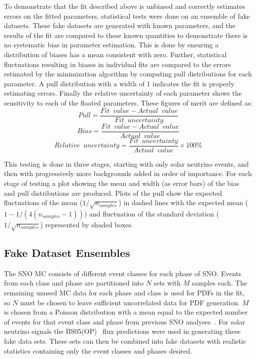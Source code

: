 To demonstrate that the fit described above is unbiased and correctly estimates errors on the fitted parameters, statistical tests were done on an ensemble of fake datasets.
These fake datasets are generated with known parameters, and the results of the fit are compared to these known quantities to demonstrate there is no systematic bias in parameter estimation.
This is done by ensuring a distribution of biases has a mean consistent with zero.
Further, statistical fluctuations resulting in biases in individual fits are compared to the errors estimated by the minimization algorithm by computing pull distributions for each parameter. 
A pull distribution with a width of 1 indicates the fit is properly estimating errors.
Finally the relative uncertainty of each parameter shows the sensitivity to each of the floated parameters.
These figures of merit are defined as:
\begin{equation}
Pull = \frac{Fit\,\,\,value - Actual\,\,\,value}{Fit\,\,\,uncertainty}
\end{equation}
\begin{equation}
Bias = \frac{Fit\,\,\,value - Actual\,\,\,value}{Actual\,\,\,value}
\end{equation}
\begin{equation}
Relative\,\,\,uncertainty = \frac{Fit\,\,\,uncertainty}{Actual\,\,\,value} \times 100\%
\end{equation}

This testing is done in three stages, starting with only solar neutrino events, and then with progressively more backgrounds added in order of importance.
For each stage of testing a plot showing the mean and width (as error bars) of the bias and pull distributions are produced.
Plots of the pull show the expected fluctuations of the mean ($1/\sqrt{n_{samples}}$) in dashed lines with the expected mean ($1 - 1/(4(n_{samples}-1))$) and fluctuation of the standard deviation ($1/\sqrt{n_{samples}}$) represented by shaded boxes.

\subsection{Fake Dataset Ensembles}

The SNO MC consists of different event classes for each phase of SNO.
Events from each class and phase are partitioned into $N$ sets with $M$ samples each. 
The remaining unused MC data for each phase and class is used for PDFs in the fit, so $N$ must be chosen to leave sufficient uncorrelated data for PDF generation.
$M$ is chosen from a Poisson distribution with a mean equal to the expected number of events for that event class and phase from previous SNO analyses~\cite{leta,ncd,3phase}.
For solar neutrino signals the BS05(OP)~\cite{bs05op} flux predictions were used in generating these fake data sets.
These sets can then be combined into fake datasets with realistic statistics containing only the event classes and phases desired.

